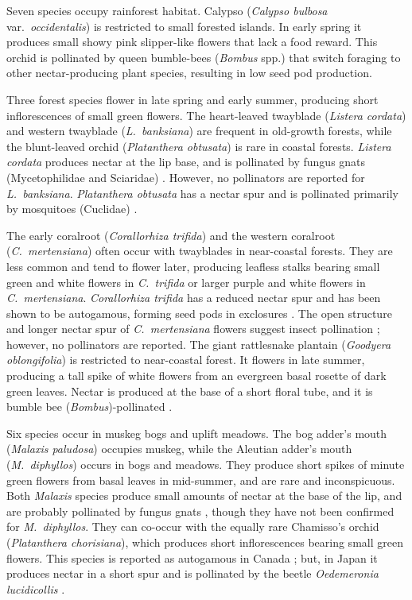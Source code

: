 \begin{multicols}{2}
Seven species occupy rainforest habitat. Calypso (\emph{Calypso bulbosa}
var.\ \emph{occidentalis}) is restricted to small forested islands. In
early spring it produces small showy pink slipper-like flowers that lack
a food reward. This orchid is pollinated by queen bumble-bees
(\emph{Bombus} spp.) that switch foraging to other nectar-producing plant
species, resulting in low seed pod production.

Three forest species flower in late spring and early summer, producing
short inflorescences of small green flowers. The heart-leaved twayblade
(\emph{Listera cordata}) and western twayblade (\emph{L.\ banksiana}) are
frequent in old-growth forests, while the blunt-leaved orchid
(\emph{Platanthera obtusata}) is rare in coastal forests. \emph{Listera
cordata} produces nectar at the lip base, and is pollinated by fungus
gnats (Mycetophilidae and Sciaridae) \citep{AckermanMesler1979}.
However, no pollinators are reported for \emph{L.\ banksiana}. \emph{Platanthera
obtusata} has a nectar spur and is pollinated primarily by mosquitoes
(Cuclidae) \citep{Gorham1976}.

The early coralroot (\emph{Corallorhiza trifida}) and the western
coralroot (\emph{C.\ mertensiana}) often occur with twayblades in
near-coastal forests. They are less common and tend to flower later,
producing leafless stalks bearing small green and white flowers in
\emph{C.\ trifida} or larger purple and white flowers in \emph{C.\
mertensiana}. \emph{Corallorhiza trifida} has a reduced nectar spur and
has been shown to be autogamous, forming seed pods in exclosures
\citep{Catling1983}. The open structure and longer nectar spur of \emph{C.\
mertensiana} flowers suggest insect pollination \citep{Freudenstein1997};
however, no pollinators are reported. The giant rattlesnake plantain
(\emph{Goodyera oblongifolia}) is restricted to near-coastal forest. It
flowers in late summer, producing a tall spike of white flowers from an
evergreen basal rosette of dark green leaves. Nectar is produced at the
base of a short floral tube, and it is bumble bee
(\emph{Bombus})-pollinated \citep{Ackerman1975}.



Six species occur in muskeg bogs and uplift meadows. The bog adder's
mouth (\emph{Malaxis paludosa}) occupies muskeg, while the Aleutian
adder's mouth (\emph{M.\ diphyllos}) occurs in bogs and meadows. They
produce short spikes of minute green flowers from basal leaves in
mid-summer, and are rare and inconspicuous. Both \emph{Malaxis} species
produce small amounts of nectar at the base of the lip, and are probably
pollinated by fungus gnats \citep[][]{ReevesReeves1984}, though they
have not been confirmed for \emph{M.\ diphyllos}. They can co-occur with
the equally rare Chamisso's orchid (\emph{Platanthera chorisiana}),
which produces short inflorescences bearing small green flowers. This
species is reported as autogamous in Canada \citep{Catling1984}; but, in
Japan it produces nectar in a short spur and is pollinated by the beetle
\emph{Oedemeronia lucidicollis} \citep{Inoue1981}.


\end{multicols}
